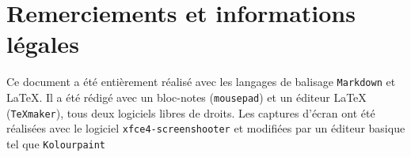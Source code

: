 \chapter{Remerciements et informations légales}

Ce document a été entièrement réalisé avec les langages de balisage \texttt{Markdown} et \LaTeX{}. 
Il a été rédigé avec un bloc-notes (\texttt{mousepad}) et un éditeur \LaTeX{} (\texttt{\TeX{}maker}), tous deux logiciels libres de droits.
Les captures d'écran ont été réalisées avec le logiciel \texttt{xfce4-screenshooter} et modifiées par un éditeur basique tel que \texttt{Kolourpaint}
